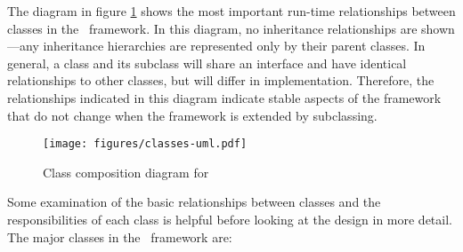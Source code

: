 The diagram in figure \ref{classes-uml} shows the
most important run-time relationships between classes in the
\aicat\ framework.  In this diagram, no inheritance
relationships are shown---any inheritance hierarchies are represented
only by their parent classes.  In general, a class and its subclass
will share an interface and have identical relationships to other
classes, but will differ in implementation.  Therefore, the
relationships indicated in this diagram indicate stable aspects of the
framework that do not change when the framework is extended by
subclassing.

\begin{figure}
\texttt{[image: figures/classes-uml.pdf]}
\caption{Class composition diagram for \aicat}
\label{classes-uml}
\end{figure}

Some examination of the basic relationships between classes and the
responsibilities of each class is helpful before looking at the design
in more detail.  The major classes in the \aicat\ framework
are:

